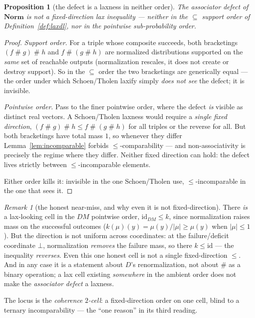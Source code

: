\documentclass[11pt]{amsart}
\theoremstyle{plain}
\newtheorem{proposition}[theorem]{Proposition}
\theoremstyle{definition}
\theoremstyle{remark}
\newtheorem{remark}[theorem]{Remark}
\newcommand{\Norm}{\mathbf{Norm}}
\newcommand{\id}{\mathrm{id}}
\newcommand{\sh}{\mathbin{\#}}
\begin{document}
\begin{proposition}[the defect is a laxness in neither order]
\label{prop:not-lax}
The associator defect of $\Norm$ is not a fixed-direction lax inequality --- neither in the
$\subseteq$ support order of Definition~\ref{def:laxdl}, nor in the pointwise sub-probability order.
\end{proposition}
\begin{proof}
\emph{Support order.} For a triple whose composite succeeds, both bracketings $(f\sh g)\sh h$ and
$f\sh(g\sh h)$ are normalized distributions supported on the \emph{same} set of reachable outputs
(normalization rescales, it does not create or destroy support). So in the $\subseteq$ order the two
bracketings are generically equal --- the order under which Schoen/Tholen laxify simply \emph{does
not see} the defect; it is invisible.

\emph{Pointwise order.} Pass to the finer pointwise order, where the defect \emph{is} visible as
distinct real vectors. A Schoen/Tholen laxness would require a \emph{single fixed direction},
$(f\sh g)\sh h\le f\sh(g\sh h)$ for all triples or the reverse for all. But both bracketings have
total mass $1$, so whenever they differ Lemma~\ref{lem:incomparable} forbids $\le$-comparability ---
and non-associativity is precisely the regime where they differ. Neither fixed direction can hold:
the defect lives strictly between $\le$-incomparable elements.

Either order kills it: invisible in the one Schoen/Tholen use, $\le$-incomparable in the one that
sees it.
\end{proof}

\begin{remark}[the honest near-miss, and why even it is not fixed-direction]
\label{rem:nearmiss}
There \emph{is} a lax-looking cell in the $DM$ pointwise order, $\id_{DM}\le k$, since normalization
raises mass on the successful outcomes ($k(\mu)(y)=\mu(y)/|\mu|\ge\mu(y)$ when $|\mu|\le1$). But the
direction is not uniform across coordinates: at the failure/deficit coordinate $\bot$, normalization
\emph{removes} the failure mass, so there $k\le\id$ --- the inequality \emph{reverses}. Even this one
honest cell is not a single fixed-direction $\le$. And in any case it is a statement about $D$'s
renormalization, not about $\sh$ as a binary operation; a lax cell existing \emph{somewhere} in the
ambient order does not make the \emph{associator defect} a laxness.
\end{remark}

The locus is the \emph{coherence $2$-cell}: a fixed-direction order on one cell, blind to a ternary
incomparability --- the ``one reason'' in its third reading.
\end{document}
